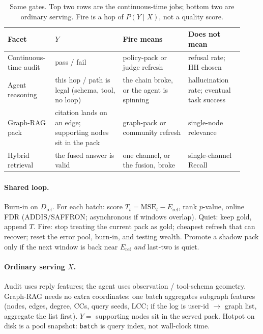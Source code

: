 \begin{table}[t]
\centering
\caption{Same gates. Top two rows are the continuous-time jobs; bottom two are ordinary serving.
Fire is a hop of \(P(Y\mid X)\), not a quality score.}
\label{tab:serving-facets}
\setlength{\tabcolsep}{4pt}
\small
\begin{tabular}{@{}>{\raggedright\arraybackslash}p{0.17\linewidth}
                >{\raggedright\arraybackslash}p{0.27\linewidth}
                >{\raggedright\arraybackslash}p{0.26\linewidth}
                >{\raggedright\arraybackslash}p{0.22\linewidth}@{}}
\toprule
Facet & \(Y\) & Fire means & Does not mean \\
\midrule
Continuous-time audit
  & pass / fail
  & policy-pack or judge refresh
  & refusal rate; HH chosen \\
Agent reasoning
  & this hop / path is legal
    (schema, tool, no loop)
  & the chain broke, or the agent is spinning
  & hallucination rate; eventual task success \\
\midrule
Graph-RAG pack
  & citation lands on an edge;
    supporting nodes sit in the pack
  & graph-pack or community refresh
  & single-node relevance \\
Hybrid retrieval
  & the fused answer is valid
  & one channel, or the fusion, broke
  & single-channel Recall \\
\bottomrule
\end{tabular}
\end{table}

\paragraph{Shared loop.}
Burn-in on \(D_{\mathrm{ref}}\).
For each batch: score \(T_t=\mathrm{MSE}_t-E_{\mathrm{ref}}\), rank \(p\)-value, online FDR
(ADDIS/SAFFRON; asynchronous if windows overlap).
Quiet: keep gold, append \(T\).
Fire: stop treating the current pack as gold; cheapest refresh that can recover;
reset the error pool, burn-in, and testing wealth.
Promote a shadow pack only if the next window is back near \(E_{\mathrm{ref}}\)
\emph{and} last-two is quiet.

\paragraph{Ordinary serving \(X\).}
Audit uses reply features; the agent uses observation / tool-schema geometry.
Graph-RAG needs no extra coordinates: one batch aggregates subgraph features
(nodes, edges, degree, CCs, query seeds, LCC; if the log is user-id \(\to\) graph list, aggregate the list first).
\(Y=\) supporting nodes sit in the served pack.
Hotpot on disk is a pool snapshot: \texttt{batch} is query index, not wall-clock time.

